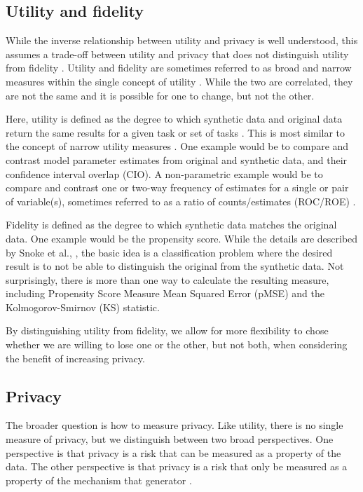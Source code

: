 \documentclass[runningheads]{llncs}
\begin{document}
\subsection{Utility and fidelity}

While the inverse relationship between utility and privacy is well understood, this assumes a trade-off between utility and privacy that does not distinguish utility from fidelity \cite{jordon2022synthetic}.  Utility and fidelity are sometimes referred to as broad and narrow measures within the single concept of utility \cite{snoke2018general,drechsler2009disclosure}.  While the two are correlated, they are not the same and it is possible for one to change, but not the other.  

Here, utility is defined as the degree to which synthetic data and original data return the same results for a given task or set of tasks \cite{jordon2022synthetic}.  This is most similar to the concept of narrow utility measures \cite{drechsler2009disclosure}.  One example would be to compare and contrast model parameter estimates from original and synthetic data, and their confidence interval overlap (CIO).  A non-parametric example would be to compare and contrast one or two-way frequency of estimates for a single or pair of variable(s), sometimes referred to as a ratio of counts/estimates (ROC/ROE) \cite{little2022comparing}.  

Fidelity is defined as the degree to which synthetic data matches the original data.  One example would be the propensity score.  While the details are described by Snoke et al., \cite{snoke2018general}, the basic idea is a classification problem where the desired result is to not be able to distinguish the original from the synthetic data.  Not surprisingly, there is more than one way to calculate the resulting measure, including Propensity Score Measure Mean Squared Error (pMSE) \cite{woo2009global} and the Kolmogorov-Smirnov (KS) statistic.

By distinguishing utility from fidelity, we allow for more flexibility to chose whether we are willing to lose one or the other, but not both, when considering the benefit of increasing privacy.

\subsection{Privacy}

The broader question is how to measure privacy.  Like utility, there is no single measure of privacy, but we distinguish between two broad perspectives.  One perspective is that privacy is a risk that can be measured as a property of the data.  The other perspective is that privacy is a risk that only be measured as a property of the mechanism that generator \cite{jordon2022synthetic}.  
\end{document}
